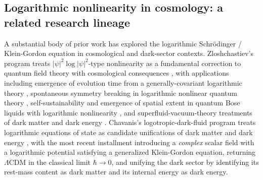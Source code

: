 \documentclass[11pt,reqno]{amsart}
\theoremstyle{plain}
\theoremstyle{definition}
\theoremstyle{remark}
\begin{document}
\subsection{Logarithmic nonlinearity in cosmology: a related research lineage}\label{sec:loglineage}

A substantial body of prior work has explored the logarithmic
Schr\"odinger / Klein-Gordon equation in cosmological and dark-sector
contexts. Zloshchastiev's program treats
$|\psi|^{2}\log|\psi|^{2}$-type nonlinearity as a fundamental
correction to quantum field theory with cosmological consequences
\cite{Zloshchastiev2010LogTime,Zloshchastiev2011SSB,AvdeenkovZloshchastiev2011,Zloshchastiev2018Stability,Zloshchastiev2020SuperfluidDM},
with applications including emergence of evolution time from a
generally-covariant logarithmic theory
\cite{Zloshchastiev2010LogTime}, spontaneous symmetry breaking in
logarithmic nonlinear quantum theory \cite{Zloshchastiev2011SSB},
self-sustainability and emergence of spatial extent in quantum Bose
liquids with logarithmic nonlinearity
\cite{AvdeenkovZloshchastiev2011}, and superfluid-vacuum-theory
treatments of dark matter and dark energy
\cite{Zloshchastiev2020SuperfluidDM}. Chavanis's logotropic-dark-fluid
program treats logarithmic equations of state as candidate unifications
of dark matter and dark energy
\cite{Chavanis2015,Chavanis2021Kessence,Chavanis2022Logotropic}, with
the most recent installment \cite{Chavanis2022Logotropic} introducing a
\emph{complex} scalar field with a logarithmic potential satisfying a
generalized Klein-Gordon equation, returning $\Lambda$CDM in the
classical limit $\hbar \to 0$, and unifying the dark sector by
identifying its rest-mass content as dark matter and its internal
energy as dark energy.
\end{document}
